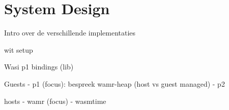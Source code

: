 \chapter{System Design}
\label{chap:3}


Intro over de verschillende implementaties

wit setup

Wasi p1 bindings (lib)

Guests
- p1 (focus): bespreek wamr-heap (host vs guest managed)
- p2

hosts
- wamr (focus)
- wasmtime

